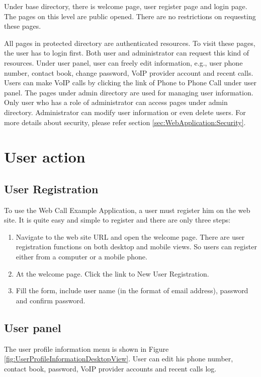 Under base directory, there is welcome page, user register page and login page. The pages on this level are public opened. There are no restrictions on requesting these pages. 

All pages in protected directory are authenticated resources. To visit these pages, the user has to login first. Both user and administrator can request this kind of resources. Under user panel, user can freely edit information, e.g., user phone number, contact book, change password, VoIP provider account and recent calls. Users can make VoIP calls by clicking the link of Phone to Phone Call under user panel. 
The pages under admin directory are used for managing user information. Only user who has a role of administrator can access pages under admin directory. Administrator can modify user information or even delete users. 
For more details about security, please refer section \ref{sec:WebApplication:Security}.

\section{User action}
\label{sec:WebApplication:UserAction}

\subsection{User Registration}

To use the Web Call Example Application, a user must register him on the web site. It is quite easy and simple to register and there are only three steps: 
\begin{enumerate}
\item Navigate to the web site URL and open the welcome page. There are user registration functions on both desktop and mobile views. So users can register either from a computer or a mobile phone.
\item At the welcome page. Click the link to New User Registration.
\item Fill the form, include user name (in the format of email address), password and confirm password.
\end{enumerate}

\subsection{User panel}
\label{sec:WebApplication:UserAction:UserPanel}

The user profile information menu is shown in Figure \ref{fig:UserProfileInformationDesktopView}. User can edit his phone number, contact book, password, VoIP provider accounts and recent calls log.


